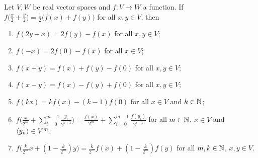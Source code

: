 \begin{lemma} \label{midpointPreservingMapLemma}
Let $V,W$ be real vector spaces and $f: V\to W$ a function. If $f\Big(\frac{x}{2} + \frac{y}{2}\Big) = \frac{1}{2}\big(f(x)+f(y)\big)$ for all $x,y\in V$, then
\begin{enumerate}
\item $f(2y-x) = 2f(y)-f(x)$ for all $x,y\in V$;
\item $f(-x) = 2f(0)-f(x)$ for all $x\in V$;
\item $f(x+y) = f(x)+f(y)-f(0)$ for all $x,y\in V$;
\item $f(x-y) = f(x)-f(y)+f(0)$ for all $x,y\in V$;
\item $f(kx) = kf(x) - (k-1)f(0)$ for all $x\in V$ and $k\in \mathbb{N}$;
\item $f\Big(\frac{x}{2^m} + \sum_{i=0}^{m-1} \frac{y_i}{2^{i+1}}\Big) = \frac{f(x)}{2^m} + \sum_{i=0}^{m-1} \frac{f(y_i)}{2^{i+1}}$ for all $m\in \mathbb{N}$, $x\in V$ and $\left\langle y_n \right\rangle\in V^m$;
\item $f\Big(\frac{k}{2^m}x + (1- \frac{k}{2^m})y\Big) = \frac{k}{2^m}f(x) + (1- \frac{k}{2^m})f(y)$ for all $m,k\in\mathbb{N}$, $x,y\in V$.
\end{enumerate}
\end{lemma}
